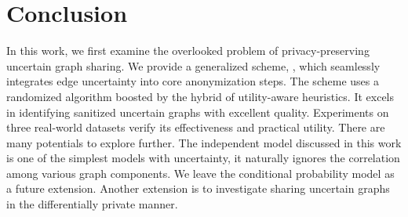 \section{Conclusion}
In this work, we first examine the overlooked problem of privacy-preserving uncertain graph sharing. 
We provide a generalized scheme, {\methodName}, which seamlessly integrates edge uncertainty into core anonymization steps.
The scheme uses a randomized algorithm boosted by the hybrid of utility-aware heuristics. 
It excels in identifying sanitized uncertain graphs with excellent quality. 
Experiments on three real-world datasets verify its effectiveness and practical utility.
There are many potentials to explore further.  
The independent model discussed in this work is one of the simplest models with uncertainty, it naturally ignores the correlation among various graph components. 
We leave the conditional probability model as a future extension. 
Another extension is to investigate sharing uncertain graphs in the differentially private manner.